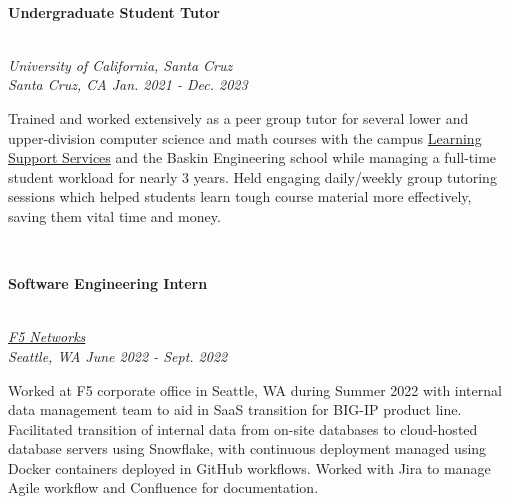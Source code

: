 \documentclass[letterpaper,10pt]{article}
\begin{document}
\begin{multicols*}{2}
\begin{minipage}{.5\textwidth}
\begin{flushleft}
    \end{flushleft}
  \end{minipage}
  \vspace{.5em} \\
  \begin{large} \textbf{Undergraduate Student Tutor} \end{large} \\
  \textit{University of California, Santa Cruz \\ Santa Cruz, CA \hfill Jan. 2021 - Dec. 2023}
  \vspace{5px} \\
  \begin{minipage}{.5\textwidth}
    \begin{flushleft}
      Trained and worked extensively as a peer group tutor for several lower and upper-division computer science and math courses with the campus \href{https://lss.ucsc.edu/}{Learning Support Services} and the Baskin Engineering school while managing a full-time student workload for nearly 3 years. Held engaging daily/weekly group tutoring sessions which helped students learn tough course material more effectively, saving them vital time and money.
    \end{flushleft}
  \end{minipage}
  \vspace{.5em} \\
  \begin{large} \textbf{Software Engineering Intern} \end{large} \\
  \textit{\href{https://www.f5.com/}{F5 Networks} \\ Seattle, WA \hfill June 2022 - Sept. 2022}
  \vspace{5px} \\
  \begin{minipage}{.5\textwidth}
    \begin{flushleft}
      Worked at F5 corporate office in Seattle, WA during Summer 2022 with internal data management team to aid in SaaS transition for BIG-IP product line. Facilitated transition of internal data from on-site databases to cloud-hosted database servers using Snowflake, with continuous deployment managed using Docker containers deployed in GitHub workflows. Worked with Jira to manage Agile workflow and Confluence for documentation.
    \end{flushleft}
  \end{minipage}
  \pagebreak
  \vspace{1em} \\

\end{multicols*}
\end{document}
